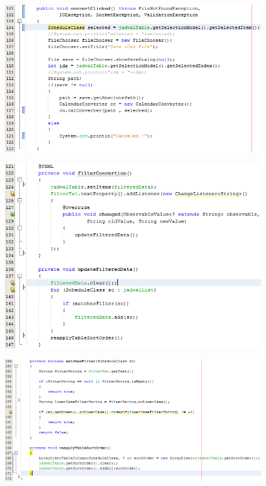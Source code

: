 \begin{enumerate}
\begin{figure}[H]
		\includegraphics[scale=0.8]{Gambar/controller3}
		\end{figure}
		\begin{figure}[H]
		\includegraphics[scale=0.8]{Gambar/controller4}
		\end{figure}
		\begin{figure}[H]
		\includegraphics[scale=0.7]{Gambar/controller5}
		\end{figure}
\end{enumerate}

